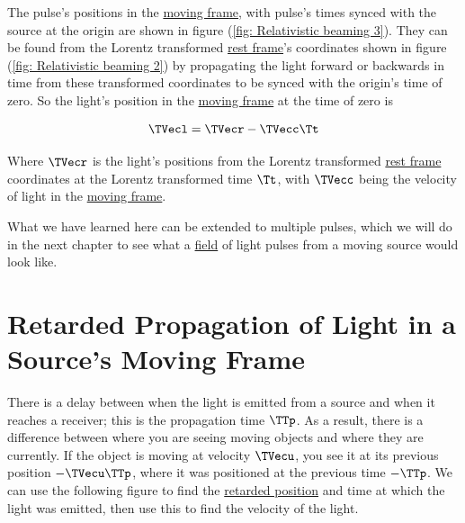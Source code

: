 The pulse's positions in the \hyperlink{def-Moving-Frame}{moving frame}, with pulse's times synced with the source at the origin are shown in figure (\ref{fig: Relativistic beaming 3}).
They can be found from the Lorentz transformed \hyperlink{def-proper-frame}{rest frame}'s coordinates shown in figure (\ref{fig: Relativistic beaming 2}) by propagating the light forward or backwards in time from these transformed coordinates to be synced with the origin's time of zero.
So the light's position in the \hyperlink{def-Moving-Frame}{moving frame} at the time of zero is

\begin{equation}
	\label{eq: synced time light}
	\TVecl  = \TVecr  - \TVecc  \Tt
\end{equation}

Where $\TVecr $ is the light's positions from the Lorentz transformed \hyperlink{def-proper-frame}{rest frame} coordinates at the Lorentz transformed time $\Tt $, with $\TVecc $ being the velocity of light in the \hyperlink{def-Moving-Frame}{moving frame}.

What we have learned here can be extended to multiple pulses, which we will do in the next chapter to see what a \hyperlink{def-field}{field} of light pulses from a moving source would look like.



\section{Retarded Propagation of Light in a Source's Moving Frame} \label{subsect: Retarded Light Propagation}

There is a delay between when the light is emitted from a source and when it reaches a receiver; this is the propagation time $\TTp$.
As a result, there is a difference between where you are seeing moving objects and where they are currently.
If the object is moving at velocity $\TVecu $, you see it at its previous position $-\TVecu  \TTp $, where it was positioned at the previous time $-\TTp $.
We can use the following figure to find the \hyperlink{def-retarded-position}{retarded position} and time at which the light was emitted, then use this to find the velocity of the light.

